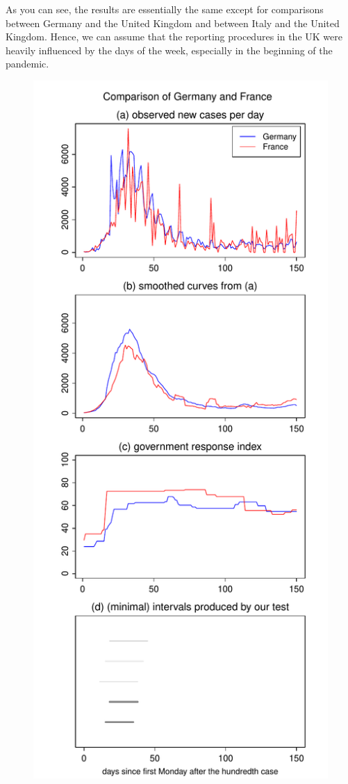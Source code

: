 \documentclass[a4paper,12pt]{article}
\numberwithin{equation}{section}
\begin{document}
{As you can see, the results are essentially the same except for comparisons between Germany and the United Kingdom and between Italy and the United Kingdom. Hence, we can assume that the reporting procedures in the UK were heavily influenced by the days of the week, especially in the beginning of the pandemic.


\begin{figure}[h!]
\begin{minipage}[t]{0.49\textwidth}
\includegraphics[width=\textwidth]{plots/DEU_vs_FRA_wa}

\end{minipage}
\end{figure}}
\end{document}
